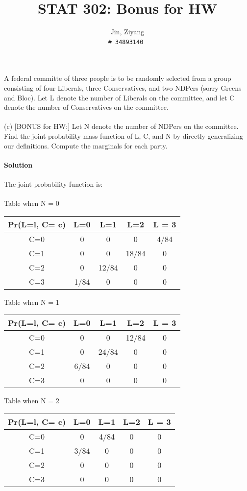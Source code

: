 \documentclass{article}
\title{STAT 302: Bonus for HW}
\author{
	Jin, Ziyang\\
	\texttt{\# 34893140}\
}
\begin{document}
	\maketitle

\noindent A federal committe of three people is to be randomly selected from a group consisting of four Liberals, three Conservatives, and two NDPers (sorry Greens and Bloc). Let L denote the number of Liberals on the committee, and let C denote the number of Conservatives on the committee.\\
\\
(c) [BONUS for HW:] Let N denote the number of NDPers on the committee. Find the joint probability mass function of L, C, and N by directly generalizing our definitions. Compute the marginals for each party.\\
\\
\textbf{Solution}\\
\\
The joint probability function is:\\
\\
Table when N = 0
\begin{center}
 \begin{tabular}{|| c c c c c ||} 
 \hline
 Pr(L=l, C= c) & L=0 & L=1 & L=2 & L = 3\\ [0.5ex] 
 \hline\hline
 C=0 & 0 & 0 & 0 & 4/84 \\ 
 \hline
 C=1 & 0 & 0 & 18/84 & 0 \\
 \hline
 C=2 & 0 & 12/84 & 0 & 0 \\
 \hline
 C=3 & 1/84 & 0 & 0 & 0 \\
 \hline
\end{tabular}
\end{center}
Table when N = 1
\begin{center}
 \begin{tabular}{|| c c c c c ||} 
 \hline
 Pr(L=l, C= c) & L=0 & L=1 & L=2 & L = 3\\ [0.5ex] 
 \hline\hline
 C=0 & 0 & 0 & 12/84 & 0 \\ 
 \hline
 C=1 & 0 & 24/84 & 0 & 0 \\
 \hline
 C=2 & 6/84 & 0 & 0 & 0 \\
 \hline
 C=3 & 0 & 0 & 0 & 0 \\
 \hline
\end{tabular}
\end{center}
Table when N = 2
\begin{center}
 \begin{tabular}{|| c c c c c ||} 
 \hline
 Pr(L=l, C= c) & L=0 & L=1 & L=2 & L = 3\\ [0.5ex] 
 \hline\hline
 C=0 & 0 & 4/84 & 0 & 0 \\ 
 \hline
 C=1 & 3/84 & 0 & 0 & 0 \\
 \hline
 C=2 & 0 & 0 & 0 & 0 \\
 \hline
 C=3 & 0 & 0 & 0 & 0 \\
 \hline
\end{tabular}
\end{center}
\end{document}
